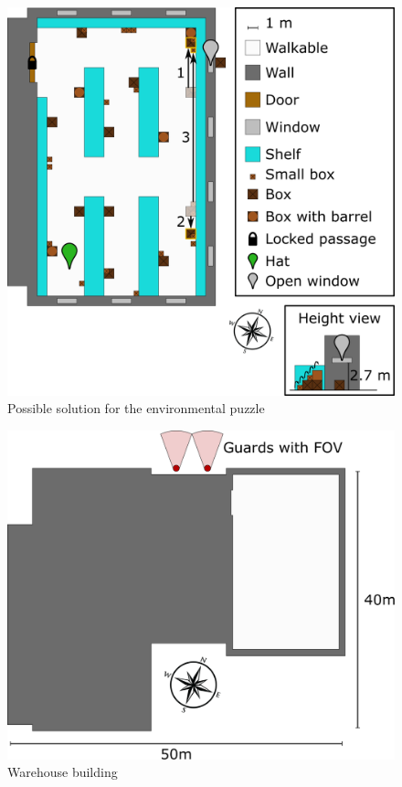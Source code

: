\begin{figure}[H]
  \centering
  \includegraphics[width=\textwidth]{../Images/Maps/warehouseSolution}
  \caption{Possible solution for the environmental puzzle}
\end{figure}

\begin{figure}[H]
  \centering
  \includegraphics[width=12cm]{../Images/Maps/warehouseBuilding}
  \caption{Warehouse building}
\end{figure}

